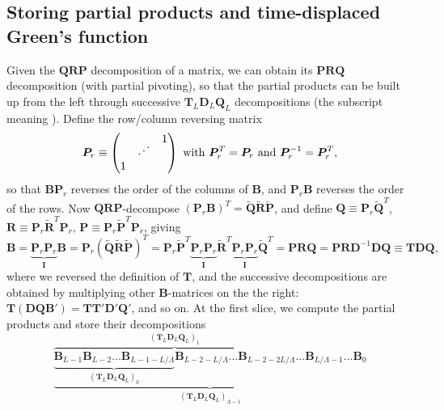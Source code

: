 \subsection{Storing partial products and time-displaced Green's function}
\label{subsec:partial}

Given the $\bm Q \bm R \bm P$ decomposition of a matrix, we can obtain its $\bm P \bm R \bm Q$ decomposition (with partial pivoting), so that the partial products can be built up from the left through successive $\bm T_L \bm D_L \bm Q_L$ decompositions (the subscript meaning ).
Define the row/column reversing matrix 
\begin{equation}
\bm P_r \equiv
\begin{pmatrix}
 & & 1 \\
 & \rddots & \\
1& & 
\end{pmatrix}
\,\, \text{with} \,\, \bm P_r^T = \bm P_r \,\, \text{and} \,\, \bm P_r^{-1} = \bm P_r^T ,
\end{equation}
so that $\bm B \bm P_r$ reverses the order of the columns of $\bm B$, and $\bm P_r \bm B$ reverses the order of the rows.
Now $\bm Q \bm R \bm P$-decompose $(\bm P_r \bm B)^T = \tilde{\bm Q} \tilde{\bm R} \tilde{\bm P}$, and define $\bm Q \equiv \bm P_r \tilde{\bm Q}^T$, $\bm R \equiv \bm P_r \tilde{\bm R}^T \bm P_r$, $\bm P \equiv \bm P_r \tilde{\bm P}^T \bm P_r$, giving
\begin{equation}
\bm B = \underbrace{\bm P_r \bm P_r}_{\bm I} \bm B = \bm P_r ( \tilde{\bm Q} \tilde{\bm R} \tilde{\bm P} )^T =  \bm P_r \tilde{\bm P}^T \underbrace{\bm P_r \bm P_r}_{\bm I} \tilde{\bm R}^T \underbrace{\bm P_r \bm P_r}_{\bm I} \tilde{\bm Q}^T = \bm P \bm R \bm Q = \bm P \bm R \bm D^{-1} \bm D \bm Q \equiv \bm T \bm D \bm Q ,
\end{equation}
where we reversed the definition of $\bm T$, and the successive decompositions are obtained by multiplying other $\bm B$-matrices on the the right: $\bm T (\bm D \bm Q \bm B') = \bm T \bm T' \bm D' \bm Q'$, and so on.
At the first slice, we compute the partial products and store their decompositions
\begin{equation}
\underbrace{ \overbrace{ \underbrace{\bm B_{L - 1} \bm B_{L-2} ... \bm B_{L - 1- L / \Lambda}}_{(\bm T_L \bm D_L \bm Q_L)_{0} }  \bm B_{L - 2 - L / \Lambda} ...\bm B_{L - 2 - 2 L / \Lambda} }^{(\bm T_L \bm D_L \bm Q_L)_{1}} ... \bm B_{L / \Lambda - 1} ...  \bm B_0}_{(\bm T_L \bm D_L \bm Q_L)_{\Lambda - 1}}
\end{equation}
